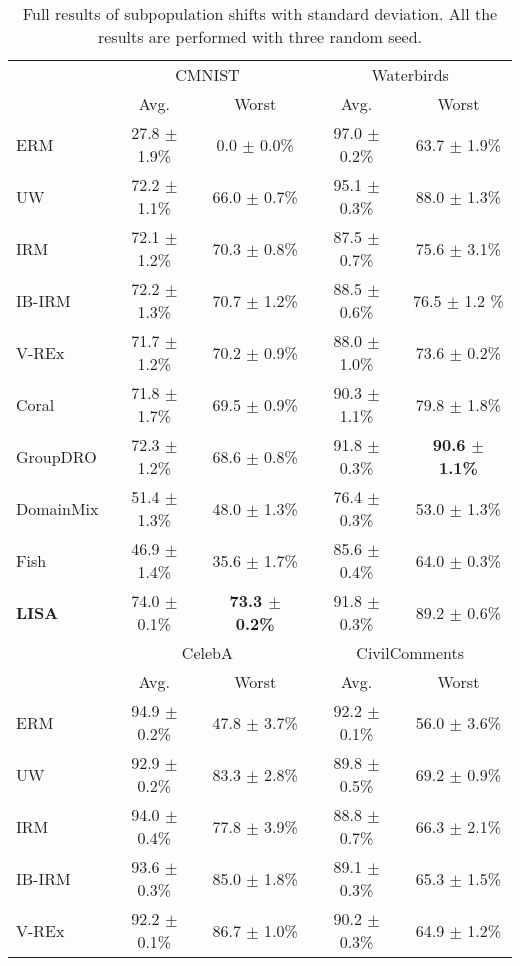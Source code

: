 \begin{table*}[h]
\small
\caption{Full results of subpopulation shifts with standard deviation. All the results are performed with three random seed.}
\label{tab:subpopulation_main_full}
\begin{center}
\begin{tabular}{l|cc|cc}
\toprule
\multirow{2}{*}{} & \multicolumn{2}{c|}{CMNIST} & \multicolumn{2}{c}{Waterbirds} \\
& Avg. & Worst  & Avg. & Worst \\\midrule
ERM & 27.8 $\pm$ 1.9\% & 0.0 $\pm$ 0.0\% & 97.0 $\pm$ 0.2\% & 63.7 $\pm$ 1.9\%\\
UW  & 72.2 $\pm$ 1.1\% & 66.0 $\pm$ 0.7\% &  95.1 $\pm$ 0.3\% & 88.0 $\pm$ 1.3\% \\
IRM & 72.1 $\pm$ 1.2\% &  70.3 $\pm$ 0.8\% &  87.5 $\pm$ 0.7\% & 75.6 $\pm$ 3.1\% \\
IB-IRM & 72.2 $\pm$ 1.3\% & 70.7 $\pm$ 1.2\% & 88.5 $\pm$ 0.6\%  & 76.5 $\pm$ 1.2 \% \\
V-REx & 71.7 $\pm$ 1.2\% & 70.2 $\pm$ 0.9\% & 88.0 $\pm$ 1.0\% & 73.6 $\pm$ 0.2\% \\
Coral & 71.8 $\pm$ 1.7\%  & 69.5 $\pm$ 0.9\% & 90.3 $\pm$ 1.1\% & 79.8 $\pm$ 1.8\% \\
GroupDRO & 72.3 $\pm$ 1.2\% & 68.6 $\pm$ 0.8\% & 91.8 $\pm$ 0.3\% & \textbf{90.6 $\pm$ 1.1\%} \\
DomainMix & 51.4 $\pm$ 1.3\% & 48.0 $\pm$ 1.3\% & 76.4 $\pm$ 0.3\% & 53.0 $\pm$ 1.3\% \\
Fish &  46.9 $\pm$ 1.4\% & 35.6 $\pm$ 1.7\% & 85.6 $\pm$ 0.4\% & 64.0 $\pm$ 0.3\%  \\
\midrule
\textbf{LISA} & 74.0 $\pm$ 0.1\% & \textbf{73.3 $\pm$ 0.2\%} & 91.8 $\pm$ 0.3\% & 89.2 $\pm$ 0.6\%  \\\midrule\midrule
& \multicolumn{2}{c|}{CelebA} & \multicolumn{2}{c}{CivilComments} \\
 & Avg. & Worst & Avg. & Worst \\\midrule
ERM  & 94.9 $\pm$ 0.2\% & 47.8 $\pm$ 3.7\% & 92.2 $\pm$ 0.1\% & 56.0 $\pm$ 3.6\% \\
UW & 92.9 $\pm$ 0.2\% & 83.3 $\pm$ 2.8\% & 89.8 $\pm$ 0.5\% & 69.2 $\pm$ 0.9\% \\
IRM &  94.0 $\pm$ 0.4\% & 77.8 $\pm$ 3.9\% &  88.8 $\pm$ 0.7\% & 66.3 $\pm$ 2.1\% \\
IB-IRM & 93.6 $\pm$ 0.3\% & 85.0 $\pm$ 1.8\% &  89.1 $\pm$ 0.3\% & 65.3 $\pm$ 1.5\%  \\ 
V-REx & 92.2 $\pm$ 0.1\% & 86.7 $\pm$ 1.0\%  & 90.2 $\pm$ 0.3\% & 64.9 $\pm$ 1.2\% \\

\end{tabular}
\end{center}
\end{table*}
